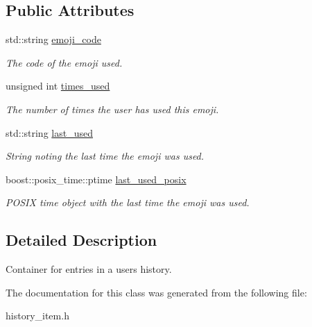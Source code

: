 \subsection*{Public Attributes}
\begin{DoxyCompactItemize}
\item 
std\+::string \hyperlink{classEmojidex_1_1Service_1_1HistoryItem_a98d6de7de108b4154cf4a47585af2489}{emoji\+\_\+code}\hypertarget{classEmojidex_1_1Service_1_1HistoryItem_a98d6de7de108b4154cf4a47585af2489}{}\label{classEmojidex_1_1Service_1_1HistoryItem_a98d6de7de108b4154cf4a47585af2489}

\begin{DoxyCompactList}\small\item\em The code of the emoji used. \end{DoxyCompactList}\item 
unsigned int \hyperlink{classEmojidex_1_1Service_1_1HistoryItem_a1cbf38f7c53d500fc9be47dfdeed167d}{times\+\_\+used}\hypertarget{classEmojidex_1_1Service_1_1HistoryItem_a1cbf38f7c53d500fc9be47dfdeed167d}{}\label{classEmojidex_1_1Service_1_1HistoryItem_a1cbf38f7c53d500fc9be47dfdeed167d}

\begin{DoxyCompactList}\small\item\em The number of times the user has used this emoji. \end{DoxyCompactList}\item 
std\+::string \hyperlink{classEmojidex_1_1Service_1_1HistoryItem_ac023cfba66fd6d1122d7d7b99009d441}{last\+\_\+used}\hypertarget{classEmojidex_1_1Service_1_1HistoryItem_ac023cfba66fd6d1122d7d7b99009d441}{}\label{classEmojidex_1_1Service_1_1HistoryItem_ac023cfba66fd6d1122d7d7b99009d441}

\begin{DoxyCompactList}\small\item\em String noting the last time the emoji was used. \end{DoxyCompactList}\item 
boost\+::posix\+\_\+time\+::ptime \hyperlink{classEmojidex_1_1Service_1_1HistoryItem_a30ffecf28921ab7593c889335789dfb1}{last\+\_\+used\+\_\+posix}\hypertarget{classEmojidex_1_1Service_1_1HistoryItem_a30ffecf28921ab7593c889335789dfb1}{}\label{classEmojidex_1_1Service_1_1HistoryItem_a30ffecf28921ab7593c889335789dfb1}

\begin{DoxyCompactList}\small\item\em P\+O\+S\+IX time object with the last time the emoji was used. \end{DoxyCompactList}\end{DoxyCompactItemize}


\subsection{Detailed Description}
Container for entries in a users history. 

The documentation for this class was generated from the following file\+:\begin{DoxyCompactItemize}
\item 
history\+\_\+item.\+h\end{DoxyCompactItemize}
